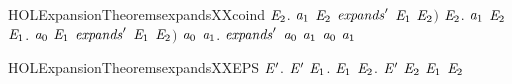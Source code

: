 \begin{SaveVerbatim}{HOLExpansionTheoremsexpandsXXcoind}
                 \HOLSymConst{\HOLTokenExists{}}\ensuremath{\HOLBoundVar{E}\sb{\mathrm{2}}}. \ensuremath{\HOLBoundVar{a}\sb{\mathrm{1}}} \HOLTokenTransBegin\HOLConst{\ensuremath{\tau}}\HOLTokenTransEnd \ensuremath{\HOLBoundVar{E}\sb{\mathrm{2}}} \HOLSymConst{\HOLTokenConj{}} \ensuremath{\HOLBoundVar{expands}\sp{\prime}} \ensuremath{\HOLBoundVar{E}\sb{\mathrm{1}}} \ensuremath{\HOLBoundVar{E}\sb{\mathrm{2}}}\ensuremath{)} \HOLSymConst{\HOLTokenConj{}}
            \HOLSymConst{\HOLTokenForall{}}\ensuremath{\HOLBoundVar{E}\sb{\mathrm{2}}}. \ensuremath{\HOLBoundVar{a}\sb{\mathrm{1}}} \HOLTokenTransBegin\HOLConst{\ensuremath{\tau}}\HOLTokenTransEnd \ensuremath{\HOLBoundVar{E}\sb{\mathrm{2}}} \HOLSymConst{\HOLTokenImp{}} \HOLSymConst{\HOLTokenExists{}}\ensuremath{\HOLBoundVar{E}\sb{\mathrm{1}}}. \ensuremath{\HOLBoundVar{a}\sb{\mathrm{0}}} \HOLTokenWeakTransBegin\HOLConst{\ensuremath{\tau}}\HOLTokenWeakTransEnd \ensuremath{\HOLBoundVar{E}\sb{\mathrm{1}}} \HOLSymConst{\HOLTokenConj{}} \ensuremath{\HOLBoundVar{expands}\sp{\prime}} \ensuremath{\HOLBoundVar{E}\sb{\mathrm{1}}} \ensuremath{\HOLBoundVar{E}\sb{\mathrm{2}}}\ensuremath{)} \HOLSymConst{\HOLTokenImp{}}
       \HOLSymConst{\HOLTokenForall{}}\ensuremath{\HOLBoundVar{a}\sb{\mathrm{0}}} \ensuremath{\HOLBoundVar{a}\sb{\mathrm{1}}}. \ensuremath{\HOLBoundVar{expands}\sp{\prime}} \ensuremath{\HOLBoundVar{a}\sb{\mathrm{0}}} \ensuremath{\HOLBoundVar{a}\sb{\mathrm{1}}} \HOLSymConst{\HOLTokenImp{}} \ensuremath{\HOLBoundVar{a}\sb{\mathrm{0}}}  \ensuremath{\HOLBoundVar{a}\sb{\mathrm{1}}}
\end{SaveVerbatim}
\newcommand{\HOLExpansionTheoremsexpandsXXcoind}{\UseVerbatim{HOLExpansionTheoremsexpandsXXcoind}}
\begin{SaveVerbatim}{HOLExpansionTheoremsexpandsXXEPS}
\HOLTokenTurnstile{} \HOLSymConst{\HOLTokenForall{}} \ensuremath{\HOLBoundVar{E}\sp{\prime}}.
         \ensuremath{\HOLBoundVar{E}\sp{\prime}} \HOLSymConst{\HOLTokenImp{}}
       \HOLSymConst{\HOLTokenForall{}}\ensuremath{\HOLBoundVar{E}\sb{\mathrm{1}}}.   \ensuremath{\HOLBoundVar{E}\sb{\mathrm{1}}} \HOLSymConst{\HOLTokenImp{}} \HOLSymConst{\HOLTokenExists{}}\ensuremath{\HOLBoundVar{E}\sb{\mathrm{2}}}.  \ensuremath{\HOLBoundVar{E}\sp{\prime}} \ensuremath{\HOLBoundVar{E}\sb{\mathrm{2}}} \HOLSymConst{\HOLTokenConj{}} \ensuremath{\HOLBoundVar{E}\sb{\mathrm{1}}}  \ensuremath{\HOLBoundVar{E}\sb{\mathrm{2}}}
\end{SaveVerbatim}
\newcommand{\HOLExpansionTheoremsexpandsXXEPS}{\UseVerbatim{HOLExpansionTheoremsexpandsXXEPS}}
